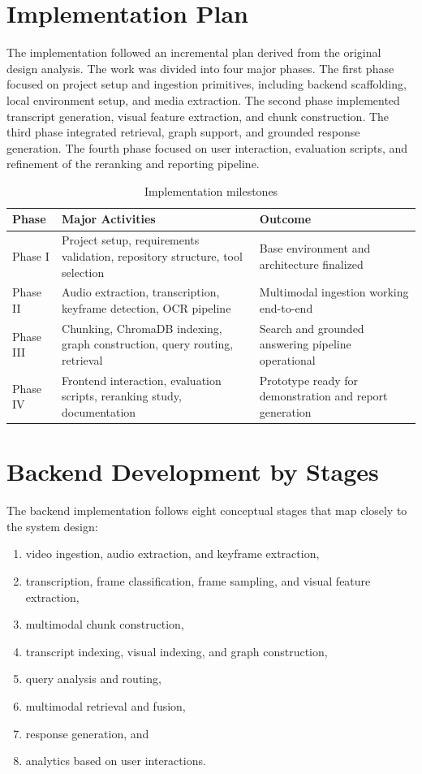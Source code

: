 \documentclass[12pt,a4paper,oneside]{report}
\begin{document}
\section{Implementation Plan}
The implementation followed an incremental plan derived from the original design analysis. The work was divided into four major phases. The first phase focused on project setup and ingestion primitives, including backend scaffolding, local environment setup, and media extraction. The second phase implemented transcript generation, visual feature extraction, and chunk construction. The third phase integrated retrieval, graph support, and grounded response generation. The fourth phase focused on user interaction, evaluation scripts, and refinement of the reranking and reporting pipeline.

\begin{table}[H]
\centering
\caption{Implementation milestones}
\label{tab:milestones}
\begin{tabularx}{\textwidth}{p{} X p{}}
\toprule
\textbf{Phase} & \textbf{Major Activities} & \textbf{Outcome} \\
\midrule
Phase I & Project setup, requirements validation, repository structure, tool selection & Base environment and architecture finalized \\
Phase II & Audio extraction, transcription, keyframe detection, OCR pipeline & Multimodal ingestion working end-to-end \\
Phase III & Chunking, ChromaDB indexing, graph construction, query routing, retrieval & Search and grounded answering pipeline operational \\
Phase IV & Frontend interaction, evaluation scripts, reranking study, documentation & Prototype ready for demonstration and report generation \\
\bottomrule
\end{tabularx}
\end{table}

\section{Backend Development by Stages}
The backend implementation follows eight conceptual stages that map closely to the system design:
\begin{enumerate}[label=\textbf{Stage \arabic*:}]
    \item video ingestion, audio extraction, and keyframe extraction,
    \item transcription, frame classification, frame sampling, and visual feature extraction,
    \item multimodal chunk construction,
    \item transcript indexing, visual indexing, and graph construction,
    \item query analysis and routing,
    \item multimodal retrieval and fusion,
    \item response generation, and
    \item analytics based on user interactions.
\end{enumerate}
\end{document}
